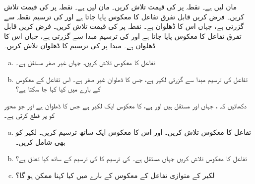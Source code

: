 مان لیں  ہے۔ نقطہ  پر  کی قیمت تلاش کریں۔
مان لیں  ہے۔ نقطہ  پر  کی قیمت تلاش کریں۔
فرض کریں قابل تفرق تفاعل  کا معکوس پایا جاتا ہے اور  کی ترسیم نقطہ  سے گزرتی ہے، جہاں اس کا ڈھلوان  ہے۔ نقطہ  پر  کی قیمت تلاش کریں۔
فرض کریں قابل تفرق تفاعل  کا معکوس پایا جاتا ہے اور  کی ترسیم مبدا سے گزرتی ہے، جہاں اس کا  ڈھلوان  ہے۔ مبدا پر  کی ترسیم کا  ڈھلوان تلاش کریں۔
\begin{enumerate}[a.]
\item
تفاعل  کا معکوس تلاش کریں، جہاں  غیر صفر مستقل ہے۔
\item
تفاعل  کی ترسیم مبدا سے گزرتی لکیر ہے، جس کا ڈھلوان  غیر صفر ہے۔ اس تفاعل کے معکوس کے بارے میں کیا کہا جا سکتا ہے؟
\end{enumerate}
دکھائیں کہ ، جہاں  اور  مستقل ہیں اور  ہے، کا معکوس ایک لکیر ہے جس کا
 ڈھلوان  ہے اور جو محور  کو  پر قطع کرتی ہے۔
\begin{enumerate}[a.]
\item
تفاعل  کا معکوس تلاش کریں۔  اور اس کا معکوس ایک ساتھ ترسیم کریں۔ لکیر  کو بھی شامل کریں۔
\item
تفاعل   کا معکوس تلاش کریں جہاں  مستقل ہے۔  کی ترسیم کا  کی ترسیم کے ساتھ کیا تعلق ہے؟
\item
لکیر  کے متوازی تفاعل کے معکوس کے بارے میں کیا کہنا ممکن ہو گا؟
\end{enumerate}
